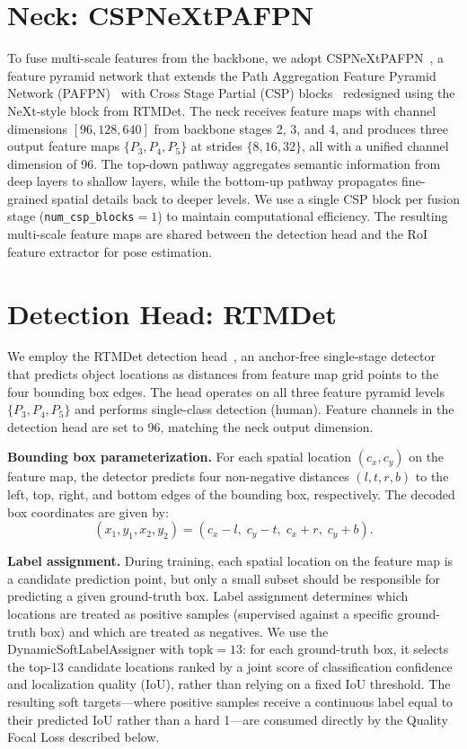 \section{Neck: CSPNeXtPAFPN}
\label{sec:neck}

To fuse multi-scale features from the backbone, we adopt CSPNeXtPAFPN~\cite{lyu2022rtmdet}, a feature pyramid network that extends the Path Aggregation Feature Pyramid Network (PAFPN)~\cite{liu2018path} with Cross Stage Partial (CSP) blocks~\cite{wang2020cspnet} redesigned using the NeXt-style block from RTMDet. The neck receives feature maps with channel dimensions $[96, 128, 640]$ from backbone stages 2, 3, and 4, and produces three output feature maps $\{P_3, P_4, P_5\}$ at strides $\{8, 16, 32\}$, all with a unified channel dimension of 96. The top-down pathway aggregates semantic information from deep layers to shallow layers, while the bottom-up pathway propagates fine-grained spatial details back to deeper levels. We use a single CSP block per fusion stage (\texttt{num\_csp\_blocks}$=1$) to maintain computational efficiency. The resulting multi-scale feature maps are shared between the detection head and the RoI feature extractor for pose estimation.

\section{Detection Head: RTMDet}
\label{sec:detection_head}

We employ the RTMDet detection head~\cite{lyu2022rtmdet}, an anchor-free single-stage detector that predicts object locations as distances from feature map grid points to the four bounding box edges. The head operates on all three feature pyramid levels $\{P_3, P_4, P_5\}$ and performs single-class detection (human). Feature channels in the detection head are set to 96, matching the neck output dimension.

\textbf{Bounding box parameterization.} For each spatial location $(c_x, c_y)$ on the feature map, the detector predicts four non-negative distances $(l, t, r, b)$ to the left, top, right, and bottom edges of the bounding box, respectively. The decoded box coordinates are given by:
\begin{equation}
    (x_1, y_1, x_2, y_2) = (c_x - l,\; c_y - t,\; c_x + r,\; c_y + b).
\end{equation}

\textbf{Label assignment.} During training, each spatial location on the feature map is a candidate prediction point, but only a small subset should be responsible for predicting a given ground-truth box. Label assignment determines which locations are treated as positive samples (supervised against a specific ground-truth box) and which are treated as negatives. We use the DynamicSoftLabelAssigner with $\text{topk}=13$: for each ground-truth box, it selects the top-13 candidate locations ranked by a joint score of classification confidence and localization quality (IoU), rather than relying on a fixed IoU threshold. The resulting soft targets---where positive samples receive a continuous label equal to their predicted IoU rather than a hard 1---are consumed directly by the Quality Focal Loss described below.

